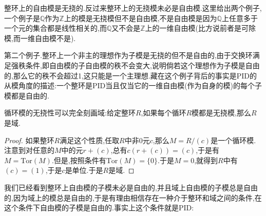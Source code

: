 整环上的自由模是无挠的.反过来整环上的无挠模未必是自由模.这里给出两个例子,一个例子是$\mathbb{Q}$作为$\mathbb{Z}$上的模是无挠模但不是自由模,不是自由模是因为$\mathbb{Q}$上任意多于一个元的集合都是线性相关的,而$\mathbb{Q}$又不会是$\mathbb{Z}$上的一维自由模(比方说前者是可除模,而一维自由模不是).

第二个例子.整环上一个非主的理想作为子模是无挠的但不是自由的,由于交换环满足强秩条件,即自由模的子自由模的秩不会变大,说明倘若这个理想作为子模是自由的,那么它的秩不会超过1,这只能是一个主理想.藏在这个例子背后的事实是PID的从模角度的描述:一个整环是PID当且仅当它的一维自由模(作为自身的模)的每个子模都是自由的.

循环模的无挠性可以完全刻画域:给定整环$R$,如果每个循环$R$模都是无挠模,那么$R$是域.
\begin{proof}
	
	如果整环$R$满足这个性质,任取$R$中非0元$c$,那么$M=R/(c)$是一个循环模.注意到对任意的$M$中的元$r+(c)$,总有$c(r+(c))=(c)$,于是有$M=\mathrm{Tor}(M)$.但是,按照条件有$\mathrm{Tor}(M)=\{0\}$.于是$M=0$,就得到$R$中有$(c)=(1)$,于是$c$是单位.于是$R$是域.
\end{proof}

我们已经看到整环上自由模的子模未必是自由的,并且域上自由模的子模总是自由的,因为域上的模总是自由的,于是有理由相信存在一种介于整环和域之间的条件,在这个条件下自由模的子模是自由的.事实上这个条件就是PID:

